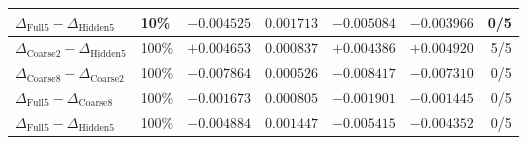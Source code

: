 \begin{table}[!htbp]
\begin{tabular}{llrrrrr}
$\Delta_{\mathrm{Full5}}-\Delta_{\mathrm{Hidden5}}$ & 10\% & $-0.004525$ & $0.001713$ & $-0.005084$ & $-0.003966$ & 0/5 \\
\midrule
$\Delta_{\mathrm{Coarse2}}-\Delta_{\mathrm{Hidden5}}$ & 100\% & $+0.004653$ & $0.000837$ & $+0.004386$ & $+0.004920$ & 5/5 \\
$\Delta_{\mathrm{Coarse8}}-\Delta_{\mathrm{Coarse2}}$ & 100\% & $-0.007864$ & $0.000526$ & $-0.008417$ & $-0.007310$ & 0/5 \\
$\Delta_{\mathrm{Full5}}-\Delta_{\mathrm{Coarse8}}$ & 100\% & $-0.001673$ & $0.000805$ & $-0.001901$ & $-0.001445$ & 0/5 \\
$\Delta_{\mathrm{Full5}}-\Delta_{\mathrm{Hidden5}}$ & 100\% & $-0.004884$ & $0.001447$ & $-0.005415$ & $-0.004352$ & 0/5 \\
\bottomrule
\end{tabular}
\end{table}
